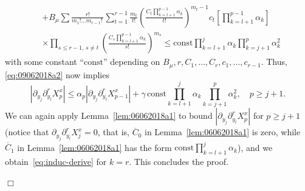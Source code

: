 \documentclass[bj]{imsart}
\newcommand{\proofendsign}{$\Box$}
\newenvironment{proof}{{\noindent \bf Proof }}
 {{\hspace*{\fill}\proofendsign\par\bigskip}}
\newcommand*{\const}{\mathrm{const}}
\newcommand*{\ol}{\overline}
\begin{document}
\begin{proof}
\begin{align*}
&+B_{\mu}\sum\frac{r!}{m_{1}!\ldots m_{r-1}!\,}\sum_{t=1}^{r-1}\frac{m_t}{t!}\left(\frac{C_{t}\prod_{k=l+1}^{p-1}\alpha_{k}}{t!}\right)^{m_{t}-1}c_t\left[\prod_{k=l+1}^{p-1}\alpha_{k}\right]
\\
&\times \prod_{s\le r-1,\,s\neq t}\left(\frac{C_{s}\prod_{k=l+1}^{p-1}\alpha_{k}}{s!}\right)^{m_{s}}\leq \const\prod_{k=l+1}^{j}\alpha_{k}\prod_{k=j+1}^{p}\alpha_{k}^{2}
\end{align*}
with some constant ``$\const$'' depending on
$B_\mu,r,C_1,\ldots,C_r,c_1,\ldots,c_{r-1}$.
Thus, \eqref{eq:09062018a2} now implies
$$
|\partial_{y_{j}}\partial_{y_{l}}^{r}X^x_{p}|
\le\alpha_p|\partial_{y_{j}}\partial_{y_{l}}^{r}X^x_{p-1}|
+\gamma \,\const\prod_{k=l+1}^{j}\alpha_{k}\prod_{k=j+1}^{p}\alpha_{k}^{2},
\quad p\ge j+1.
$$
We can again apply Lemma~\ref{lem:06062018a1}
to bound $|\partial_{y_{j}}\partial_{y_{l}}^r X^x_{p}|$
for $p\ge j+1$
(notice that $\partial_{y_j}\partial_{y_l}^r X^x_j=0$, that is,
$\ol C_0$ in Lemma~\ref{lem:06062018a1} is zero,
while $\ol C_1$ in Lemma~\ref{lem:06062018a1}
has the form $\const\prod_{k=l+1}^j \alpha_k$),
and we obtain~\eqref{eq:induc-derive} for $k=r$.
This concludes the proof.
\end{proof}
\end{document}
